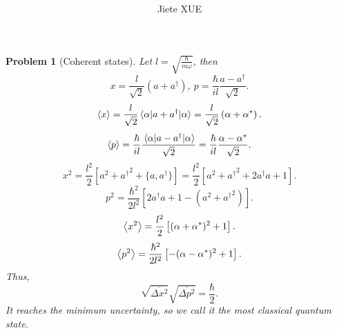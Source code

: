 \documentclass{article}
\title{\textbf{\mytitle}}
\author{Jiete XUE}
\date{\mydate}
\theoremstyle{1}
\newtheorem{problem}{Problem}
\begin{document}
\maketitle
\begin{problem}[Coherent states]
    Let $l=\sqrt{\frac{\hbar}{m\omega}}$, then
    \begin{equation}
        x=\frac{l}{\sqrt{2}}\left(a+a^\dagger\right),\ p=\frac{\hbar}{il}\frac{a-a^\dagger}{\sqrt{2}}.
    \end{equation}
    \begin{equation}
        \expval{x}=\frac{l}{\sqrt{2}}\expval{a+a^\dagger}{\alpha}=\frac{l}{\sqrt{2}}\left(\alpha+\alpha^*\right).
    \end{equation}
    \begin{equation}
        \expval{p}=\frac{\hbar}{il}\frac{\expval{a-a^\dagger}{\alpha}}{\sqrt{2}}=\frac{\hbar}{il}\frac{\alpha-\alpha^*}{\sqrt{2}}.
    \end{equation}
\begin{equation}
    x^2=\frac{l^2}{2}\left[a^2+{a^\dagger}^2+\{a,a^\dagger\}\right]=\frac{l^2}{2}\left[a^2+{a^\dagger}^2+2a^\dagger a+1\right].
\end{equation}
\begin{equation}
    p^2=\frac{\hbar^2}{2l^2}[2a^\dagger a+1-(a^2+{a^\dagger}^2)].
\end{equation}
\begin{equation}
    \expval{x^2}=\frac{l^2}{2}\left[(\alpha+\alpha^*)^2+1\right].
\end{equation}
\begin{equation}
    \expval{p^2}=\frac{\hbar^2}{2l^2}\left[-(\alpha-\alpha^*)^2+1\right].
\end{equation}
Thus, 
\begin{equation}
    \sqrt{\overline{\Delta x^2}}\sqrt{\overline{\Delta p^2}}=\frac{\hbar}{2}.
\end{equation}
It reaches the minimum uncertainty, so we call it the most classical quantum state.
\end{problem}
\end{document}
